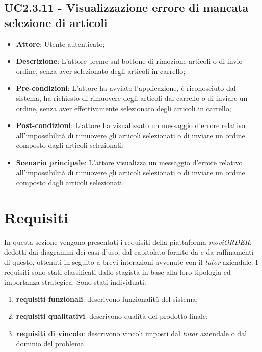 \subsection{UC2.3.11 - Visualizzazione errore di mancata selezione di articoli}

\begin{itemize}
	\item \textbf{Attore}: Utente autenticato;
	\item \textbf{Descrizione}: L'attore preme sul bottone di rimozione articoli o di invio ordine, senza aver selezionato degli articoli in carrello;
	\item \textbf{Pre-condizioni}: L'attore ha avviato l'applicazione, è riconosciuto dal sistema, ha richiesto di rimuovere degli articoli dal carrello o di inviare un ordine, senza aver effettivamente selezionato degli articoli in carrello;
	\item \textbf{Post-condizioni}: L'attore ha visualizzato un messaggio d'errore relativo all'impossibilità di rimuovere gli articoli selezionati o di inviare un ordine composto dagli articoli selezionati;
	\item \textbf{Scenario principale}: L'attore visualizza un messaggio d'errore relativo all'impossibilità di rimuovere gli articoli selezionati o di inviare un ordine composto dagli articoli selezionati.
\end{itemize}

\newpage

\section{Requisiti}

In questa sezione vengono presentati i requisiti della piattaforma \textit{moviORDER}, dedotti dai diagrammi dei casi d'uso, dal capitolato fornito da \visione{} e da raffinamenti di questo, ottenuti in seguito a brevi interazioni avvenute con il \textit{tutor} aziendale. I requisiti sono stati classificati dallo stagista in base alla loro tipologia ed importanza strategica. Sono stati individuati:
\begin{enumerate}
	\item \textbf{requisiti funzionali}: descrivono funzionalità del sistema;
	\item \textbf{requisiti qualitativi}: descrivono qualità del prodotto finale;
	\item \textbf{requisiti di vincolo}: descrivono vincoli imposti dal \textit{tutor} aziendale o dal dominio del problema.
\end{enumerate}

